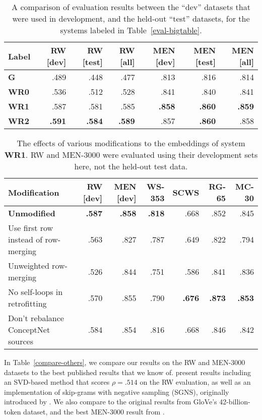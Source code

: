 \documentclass[11pt,letterpaper]{article}
\begin{document}
\begin{table*}[t]
\centering
\begin{tabular}{lrrrrrr}
\toprule
Label   & RW [dev] & RW [test] & RW [all] & MEN [dev] & MEN [test] & MEN [all]\\
\midrule
\bf G   &    .489  &    .448  &    .477  &    .813  &    .816 &    .814 \\
\bf WR0 &    .536  &    .512  &    .528  &    .841  &    .840 &    .841 \\
\bf WR1 &    .587  &    .581  &    .585  &\bf .858  &\bf .860 &\bf .859 \\
\bf WR2 &\bf .591  &\bf .584  &\bf .589  &    .857  &\bf .860 &    .858 \\
\bottomrule
\end{tabular}

\caption{
    A comparison of evaluation results between the ``dev'' datasets that were
    used in development, and the held-out ``test'' datasets, for the systems
    labeled in Table~\ref{eval-bigtable}.
}
\label{eval-dev-test}
\end{table*}

\begin{table*}[t]
\centering
\begin{tabular}{lrrrrrr}
\toprule
Modification & RW [dev] & MEN [dev] & WS-353 & SCWS &  RG-65 &  MC-30 \\
\midrule
{\bf Unmodified}                     & \bf .587 & \bf .858 & \bf .818 &  .668 &   .852 &   .845 \\
Use first row instead of row-merging & .563 &      .827 &    .787 &  .649 &   .822 &   .794 \\
Unweighted row-merging               & .526 &      .844 &    .751 &  .586 &   .841 &   .836 \\
No self-loops in retrofitting        & .570 &      .855 &    .790 & \bf .676 & \bf .873 & \bf .853 \\
Don't rebalance ConceptNet sources   & .584 &      .854 &    .816 &  .668 &   .846 &   .842 \\
\bottomrule
\end{tabular}
\caption{
    The effects of various modifications to the embeddings of system {\bf WR1}.
    RW and MEN-3000 were evaluated using their development sets here,
    not the held-out test data.
}
\label{eval-variations}
\end{table*}

In Table~\ref{compare-others}, we compare our results on the RW and MEN-3000
datasets to the best published results that we know of.
 present results including an SVD-based method
that scores $\rho = .514$ on the RW evaluation, as well as an implementation
of skip-grams with negative sampling (SGNS), originally introduced by
. We also compare to the original results from
GloVe's 42-billion-token dataset, and the best MEN-3000 result from
.
\end{document}
